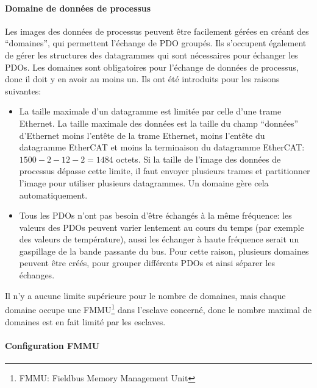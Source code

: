 \documentclass[a4paper,12pt,BCOR6mm,bibtotoc,idxtotoc]{scrbook}
\begin{document}
\paragraph{Domaine de donn\'ees de processus}

Les images des donn\'ees de processus peuvent \^etre facilement
g\'er\'ees en cr\'eant des ``domaines'', qui permettent l'\'echange de
PDO group\'es. Ils s'occupent \'egalement de g\'erer les structures
des datagrammes qui sont n\'ecessaires pour \'echanger les PDOs.  Les
domaines sont obligatoires pour l'\'echange de donn\'ees de processus,
donc il doit y en avoir au moins un. Ils ont \'et\'e introduits pour
les raisons suivantes:

\begin{itemize}

\item La taille maximale d'un datagramme est limit\'ee par celle d'une
  trame Ethernet. La taille maximale des donn\'ees est la taille du
  champ ``donn\'ees'' d'Ethernet moins l'ent\^ete de la trame
  Ethernet, moins l'ent\^ete du datagramme EtherCAT et moins la
  terminaison du datagramme EtherCAT: $1500 - 2 - 12 - 2 = 1484$
  octets. Si la taille de l'image des donn\'ees de processus d\'epasse
  cette limite, il faut envoyer plusieurs trames et partitionner
  l'image pour utiliser plusieurs datagrammes. Un domaine g\`ere cela
  automatiquement.

\item Tous les PDOs n'ont pas besoin d'\^etre \'echang\'es \`a la
  m\^eme fr\'equence: les valeurs des PDOs peuvent varier lentement au
  cours du temps (par exemple des valeurs de temp\'erature), aussi les
  \'echanger \`a haute fr\'equence serait un gaspillage de la bande
  passante du bus. Pour cette raison, plusieurs domaines peuvent
  \^etre cr\'e\'es, pour grouper diff\'erents PDOs et ainsi s\'eparer
  les \'echanges.

\end{itemize}

Il n'y a aucune limite sup\'erieure pour le nombre de domaines, mais
chaque domaine occupe une FMMU\footnote{FMMU: Fieldbus Memory
Management Unit} dans l'esclave concern\'e, donc le nombre maximal de
domaines est en fait limit\'e par les esclaves.

\paragraph{Configuration FMMU}
\end{document}
